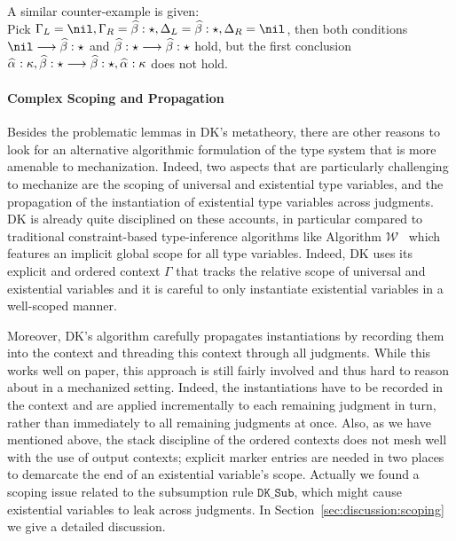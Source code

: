 \begin{itemize}
        A similar counter-example is given:\\
        Pick $\Gm_L = \nil, \Gm_R = \bt:\star, \Delta_L = \bt:\star, \Delta_R = \nil$, then both conditions
        $\nil\longrightarrow \bt:\star$ and $\bt:\star\longrightarrow \bt:\star$ hold, but the first conclusion
        $\al:\kappa,\bt:\star \longrightarrow \bt:\star,\al:\kappa$ does not hold.
\end{itemize}

\paragraph{Complex Scoping and Propagation}

Besides the problematic lemmas in DK's metatheory, there are other reasons to
look for an alternative algorithmic formulation of the type system that is more
amenable to mechanization. Indeed, two aspects that are particularly
challenging to mechanize are the scoping of universal and existential type
variables, and the propagation of the instantiation of existential type
variables across judgments. 
DK is already quite disciplined on these accounts, in particular compared to
traditional constraint-based type-inference algorithms like Algorithm $\mathcal{W}$~\citep{milner1978theory} which
features an implicit global scope for all type variables. Indeed, DK uses its
explicit and ordered context $\Gamma$ that tracks the relative scope of universal and
existential variables and it is careful to only instantiate existential
variables in a well-scoped manner.

Moreover, DK's algorithm carefully propagates instantiations by recording them
into the context and threading this context through all judgments. 
While this works well on paper, this approach is still fairly involved and thus
hard to reason about in a mechanized setting. Indeed, the instantiations have
to be recorded in the context and are applied incrementally to each remaining
judgment in turn, rather than immediately to all remaining judgments at once.
Also, as we have mentioned above, the stack discipline of the ordered contexts
does not mesh well with the use of output contexts; explicit marker entries are
needed in two places to demarcate the end of an existential variable's scope.
Actually we found a scoping issue related to the subsumption rule $\mathtt{DK\_Sub}$,
which might cause existential variables to leak across judgments.
In Section~\ref{sec:discussion:scoping} we give a detailed discussion.

